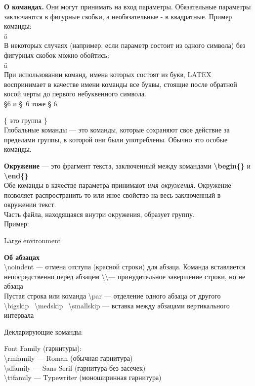 \noindent
{\bfseries О командах.} Они могут принимать на вход параметры. Обязательные параметры заключаются в фигурные скобки, а необязательные - в квадратные.  Пример команды: \\
\"{a} \\
В некоторых случаях (например, если параметр состоит из одного символа) без фигурных скобок можно обойтись: \\
\"a \\
При использовании команд, имена которых состоят из букв, LATEX воспринимает в качестве имени команды все буквы, стоящие после обратной косой черты до первого небуквенного символа. \\
\noindent
\S 6 и \S \ 6 тоже \S{} 6
\medskip

\noindent
\{ это группа \}\\
Глобальные команды --- это команды, которые сохраняют свое действие за пределами группы, в которой они были употреблены. Обычно это особые команды.
\medskip

\noindent
{\bfseries Окружение} --- это фрагмент текста, заключенный между командами {\bfseries \textbackslash begin\{\}} и {\bfseries \textbackslash end\{\}}\\
Обе команды в качестве параметра принимают {\it имя окружения}. Окружение позволяет распространить то или иное свойство на весь заключенный в окружении текст. \\
Часть файла, находящаяся внутри окружения, образует группу.\\
Пример:\\
\begin{large}
    Large environment
\end{large}
\medskip

\noindent
{\bfseries Об абзацах} \\
\textbackslash noindent --- отмена отступа (красной строки) для абзаца. Команда вставляется непосредственно перед абзацем
\textbackslash \textbackslash --- принудительное завершение строки, но не абзаца \\
Пустая строка или команда \textbackslash par --- отделение одного абзаца от другого\\
\textbackslash bigskip \
\textbackslash medskip \
\textbackslash smallskip --- вставка между абзацами вертикального интервала
\pagebreak

\bigskip
\noindent
{\large Декларирующие команды:}
\medskip

\noindent
Font Family (гарнитуры):                                                   \\
\textbackslash rmfamily --- {\rmfamily Roman (обычная гарнитура)}          \\
\textbackslash sffamily --- {\sffamily Sans Serif (гарнитура без засечек)} \\
\textbackslash ttfamily --- {\ttfamily Typewriter (моноширинная гарнитура)}
\medskip

